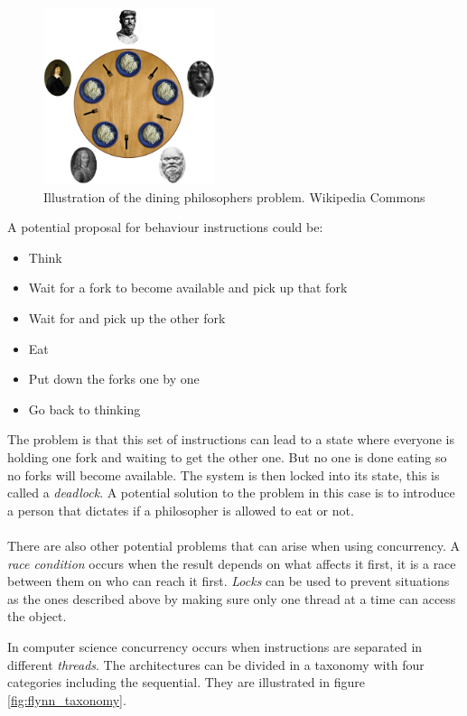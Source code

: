 \documentclass[10pt,a4paper]{report}
\begin{document}
\begin{figure}[h]
    \centering
    \includegraphics[width=5cm]{dining_philosophers.png}
    \caption{Illustration of the dining philosophers problem. Wikipedia Commons}
    \label{fig:dining_philosophers}
\end{figure}

A potential proposal\cite{hoare1985communicating} for behaviour instructions could be:
\begin{itemize}
 \item Think
 \item Wait for a fork to become available and pick up that fork
 \item Wait for and pick up the other fork
 \item Eat
 \item Put down the forks one by one
 \item Go back to thinking
\end{itemize}
The problem is that this set of instructions can lead to a state where everyone is holding one fork and waiting to get the other one\cite{hoare1985communicating}. But no one is done eating so no forks will become available. The system is then locked into its state, this is called a \emph{deadlock}\cite{hoare1985communicating, introduction_hpc_hager}. A potential solution to the problem in this case is to introduce a person that dictates if a philosopher is allowed to eat or not\cite{hoare1985communicating}.\\
\\
There are also other potential problems that can arise when using concurrency. A \emph{race condition} occurs when the result depends on what affects it first, it is a race between them on who can reach it first\cite{introduction_hpc_hager}. \emph{Locks} can be used to prevent situations as the ones described above by making sure only one thread at a time can access the object\cite{introduction_hpc_hager}.

\newpage
In computer science concurrency occurs when instructions are separated in different \emph{threads}. The architectures can be divided in a taxonomy with four categories including the sequential. They are illustrated in figure \ref{fig:flynn_taxonomy}.
\end{document}
